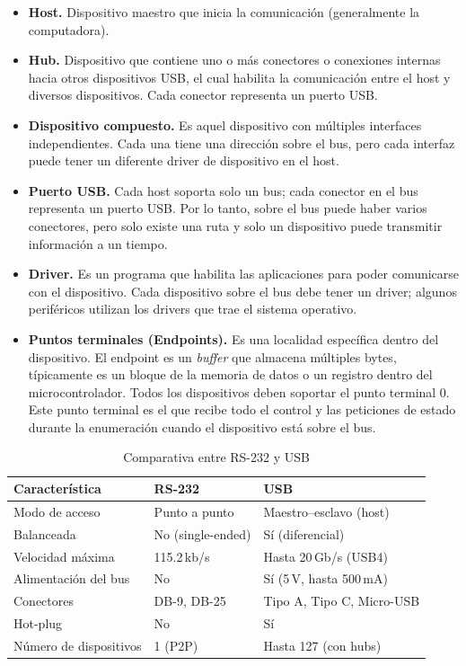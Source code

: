 \begin{itemize}
    \item \textbf{Host.} Dispositivo maestro que inicia la comunicación (generalmente la computadora).
    \item \textbf{Hub.} Dispositivo que contiene uno o más conectores o conexiones internas hacia otros dispositivos USB, el cual habilita la comunicación entre el host y diversos dispositivos. Cada conector representa un puerto USB.
    \item \textbf{Dispositivo compuesto.} Es aquel dispositivo con múltiples interfaces independientes. Cada una tiene una dirección sobre el bus, pero cada interfaz puede tener un diferente driver de dispositivo en el host.
    \item \textbf{Puerto USB.} Cada host soporta solo un bus; cada conector en el bus representa un puerto USB. Por lo tanto, sobre el bus puede haber varios conectores, pero solo existe una ruta y solo un dispositivo puede transmitir información a un tiempo.
    \item \textbf{Driver.} Es un programa que habilita las aplicaciones para poder comunicarse con el dispositivo. Cada dispositivo sobre el bus debe tener un driver; algunos periféricos utilizan los drivers que trae el sistema operativo.
    \item \textbf{Puntos terminales (Endpoints).} Es una localidad específica dentro del dispositivo. El endpoint es un \textit{buffer} que almacena múltiples bytes, típicamente es un bloque de la memoria de datos o un registro dentro del microcontrolador. Todos los dispositivos deben soportar el punto terminal 0. Este punto terminal es el que recibe todo el control y las peticiones de estado durante la enumeración cuando el dispositivo está sobre el bus.
\end{itemize}

\begin{table}[htbp]
\centering
\small
\caption{Comparativa entre RS-232 y USB}
\begin{tabularx}{\textwidth}{@{}lXX@{}}
\toprule
\textbf{Característica} & \textbf{RS-232} & \textbf{USB} \\
\midrule
Modo de acceso & Punto a punto & Maestro--esclavo (host) \\
Balanceada & No (single-ended) & Sí (diferencial) \\
Velocidad máxima & 115.2\,kb/s & Hasta 20\,Gb/s (USB4) \\
Alimentación del bus & No & Sí (5\,V, hasta 500\,mA) \\
Conectores & DB-9, DB-25 & Tipo A, Tipo C, Micro-USB \\
Hot-plug & No & Sí \\
Número de dispositivos & 1 (P2P) & Hasta 127 (con hubs) \\
\bottomrule
\end{tabularx}
\end{table}


